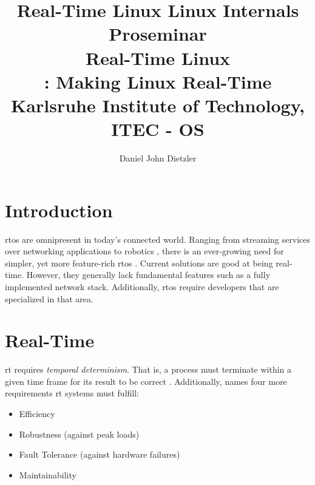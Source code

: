\documentclass[10pt,twocolumn,a4paper]{article}
\begin{document}


\title{Real-Time Linux}

\title{%
{\normalfont \normalsize Linux Internals Proseminar}\\%
Real-Time Linux \\%
{\normalfont \normalsize {}: Making Linux Real-Time}\\%
{\normalfont \small
Karlsruhe Institute of Technology, ITEC - OS
}%
}

\author{Daniel John Dietzler}

\newcommand{\code}[1]{{\tt \small{#1}}}

\maketitle

\begin{abstract}
\end{abstract}

\section{Introduction}\label{sec:introduction}

\acrfull{rtos} are omnipresent in today's connected world.
Ranging from streaming services over networking applications to robotics \cite{buttazzo_hard_1997}, there is an ever-growing need for simpler, yet more feature-rich \acrshort{rtos} \cite{reghenzani_realtime_2019}.
Current solutions are good at being real-time.
However, they generally lack fundamental features such as a fully implemented network stack.
Additionally, \acrshort{rtos} require developers that are specialized in that area.

\section{Real-Time}
\acrfull{rt} requires \emph{temporal determinism}.
That is, a process must terminate within a given time frame for its result to be correct \cite{reghenzani_realtime_2019}.
Additionally, \cite{buttazzo_hard_1997} names four more requirements \acrshort{rt} systems must fulfill:

\begin{itemize}
  \item Efficiency
  \item Robustness (against peak loads)
  \item Fault Tolerance (against hardware failures)
  \item Maintainability
\end{itemize}
\end{document}
